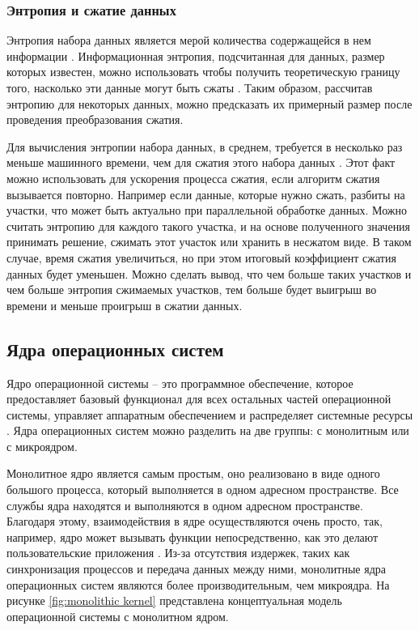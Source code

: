 \subsubsection{Энтропия и сжатие данных}

Энтропия набора данных является мерой количества содержащейся в нем информации \cite{entropy-paper}. Информационная энтропия, подсчитанная для данных, размер которых известен, можно использовать чтобы получить теоретическую границу того, насколько эти данные могут быть сжаты \cite{entropy-paper}. Таким образом, рассчитав энтропию для некоторых данных, можно предсказать их примерный размер после проведения преобразования сжатия.

Для вычисления энтропии набора данных, в среднем, требуется в несколько раз меньше машинного времени, чем для сжатия этого набора данных \cite{entropy-paper}. Этот факт можно использовать для ускорения процесса сжатия, если алгоритм сжатия вызывается повторно. Например если данные, которые нужно сжать, разбиты на участки, что может быть актуально при параллельной обработке данных. Можно считать энтропию для каждого такого участка, и на основе полученного значения принимать решение, сжимать этот участок или хранить в несжатом виде. В таком случае, время сжатия увеличиться, но при этом итоговый коэффициент сжатия данных будет уменьшен. Можно сделать вывод, что чем больше таких участков и чем больше энтропия сжимаемых участков, тем больше будет выигрыш во времени и меньше проигрыш в сжатии данных.

\subsection{Ядра операционных систем}

Ядро операционной системы -- это программное обеспечение, которое предоставляет базовый функционал для всех остальных частей операционной системы, управляет аппаратным обеспечением и распределяет системные ресурсы \cite{kernel-development}. Ядра операционных систем можно разделить на две группы: с монолитным или с микроядром.

Монолитное ядро является самым простым, оно реализовано в виде одного большого процесса, который выполняется в одном адресном пространстве. Все службы ядра находятся и выполняются в одном адресном пространстве. Благодаря этому, взаимодействия в ядре осуществляются очень просто, так, например, ядро может вызывать функции непосредственно, как это делают пользовательские приложения \cite{kernel-development}. Из-за отсутствия издержек, таких как синхронизация процессов и передача данных между ними, монолитные ядра операционных систем являются более производительным, чем микроядра. На рисунке \ref{fig:monolithic kernel} представлена концептуальная модель операционной системы с монолитном ядром.

